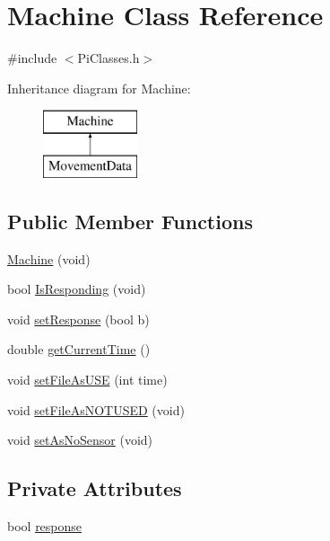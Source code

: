\hypertarget{classMachine}{}\section{Machine Class Reference}
\label{classMachine}


{\ttfamily \#include $<$Pi\+Classes.\+h$>$}

Inheritance diagram for Machine\+:\begin{figure}[H]
\begin{center}
\leavevmode
\includegraphics[height=2.000000cm]{classMachine}
\end{center}
\end{figure}
\subsection*{Public Member Functions}
\begin{DoxyCompactItemize}
\item 
\hyperlink{classMachine_a80c3b107d589a615ff42f760a5d64b32}{Machine} (void)
\item 
bool \hyperlink{classMachine_ad0e9081e633c3f1dd8867e7d147a261d}{Is\+Responding} (void)
\item 
void \hyperlink{classMachine_aae30fc95cd4f4089b79bcd680cf774eb}{set\+Response} (bool b)
\item 
double \hyperlink{classMachine_a2fb11e330fa5e2b6a7134ee55ac7ef43}{get\+Current\+Time} ()
\item 
void \hyperlink{classMachine_a2596d7951c310917a62a2be50ff62b5a}{set\+File\+As\+U\+S\+E} (int time)
\item 
void \hyperlink{classMachine_aa2691fd518ccf5bf91f641d168c6e67d}{set\+File\+As\+N\+O\+T\+U\+S\+E\+D} (void)
\item 
void \hyperlink{classMachine_aa9451bf11291573e776f72305b41646f}{set\+As\+No\+Sensor} (void)
\end{DoxyCompactItemize}
\subsection*{Private Attributes}
\begin{DoxyCompactItemize}
\item 
bool \hyperlink{classMachine_a94a9f103d3bf3565dec774c1c7480803}{response}
\end{DoxyCompactItemize}


